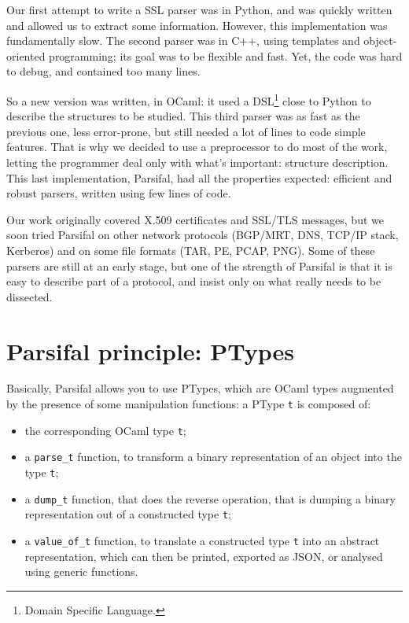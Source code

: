 \documentclass{article}
\begin{document}
Our first attempt to write a SSL parser was in Python, and was
quickly written and allowed us to extract some information. However,
this implementation was fundamentally slow. The second parser was in
C++, using templates and object-oriented programming; its goal was to
be flexible and fast. Yet, the code was hard to debug, and contained
too many lines.

So a new version was written, in OCaml: it used a DSL\footnote{Domain
  Specific Language.} close to Python to describe the structures
to be studied. This third parser was as fast as the previous one, less
error-prone, but still needed a lot of lines to code simple
features. That is why we decided to use a preprocessor to do most of
the work, letting the programmer deal only with what's important:
structure description. This last implementation, Parsifal, had all the
properties expected: efficient and robust parsers, written using few
lines of code.

Our work originally covered X.509 certificates and SSL/TLS messages,
but we soon tried Parsifal on other network protocols (BGP/MRT, DNS,
TCP/IP stack, Kerberos) and on some file formats (TAR, PE, PCAP,
PNG). Some of these parsers are still at an early stage, but one of
the strength of Parsifal is that it is easy to describe part of a
protocol, and insist only on what really needs to be dissected.



\section{Parsifal principle: PTypes}

Basically, Parsifal allows you to use PTypes, which are OCaml types
augmented by the presence of some manipulation functions: a PType
\texttt{t} is composed of:
\begin{itemize}
\item the corresponding OCaml type \texttt{t};
\item a \texttt{parse\_t} function, to transform a binary
  representation of an object into the type \texttt{t};
\item a \texttt{dump\_t} function, that does the reverse operation,
  that is dumping a binary representation out of a constructed type
  \texttt{t};
\item a \texttt{value\_of\_t} function, to translate a constructed
  type \texttt{t} into an abstract representation, which can then be
  printed, exported as JSON, or analysed using generic functions.
\end{itemize}
\end{document}
